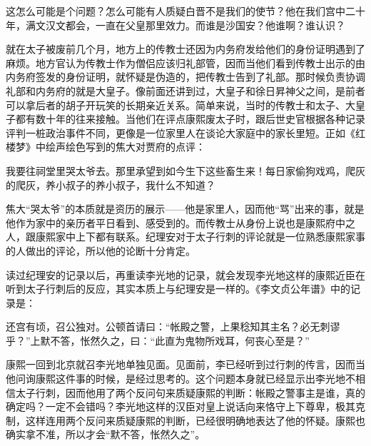 
\begin{bookquote}这怎么可能是个问题？怎么可能有人质疑白晋不是我们的使节？他在我们宫中二十年，满文汉文都会，一直在父皇那里效力。而谁是沙国安？他谁啊？谁认识？\end{bookquote}


就在太子被废前几个月，地方上的传教士还因为内务府发给他们的身份证明遇到了麻烦。地方官认为传教士作为僧侣应该归礼部管，因而当他们看到传教士出示的由内务府签发的身份证明，就怀疑是伪造的，把传教士告到了礼部。那时候负责协调礼部和内务府的就是大皇子。像前面还讲到过，大皇子和徐日昇神父之间，是前者可以拿后者的胡子开玩笑的长期亲近关系。简单来说，当时的传教士和太子、大皇子都有数十年的往来接触。当他们在评点康熙废太子时，跟后世史官根据各种记录评判一桩政治事件不同，更像是一位家里人在谈论大家庭中的家长里短。正如《红楼梦》中绘声绘色写到的焦大对贾府的点评：



\begin{bookquote}我要往祠堂里哭太爷去。那里承望到如今生下这些畜生来！每日家偷狗戏鸡，爬灰的爬灰，养小叔子的养小叔子，我什么不知道？\end{bookquote}


焦大“哭太爷”的本质就是资历的展示——他是家里人，因而他“骂”出来的事，就是他作为家中的亲历者平日看到、感受到的。而传教士从身份上说也是康熙府中之人，跟康熙家中上下都有联系。纪理安对于太子行刺的评论就是一位熟悉康熙家事的人做出的评论，所以他的论断十分肯定。



读过纪理安的记录以后，再重读李光地的记录，就会发现李光地这样的康熙近臣在听到太子行刺后的反应，其实本质上与纪理安是一样的。《李文贞公年谱》中的记录是：



\begin{bookquote}还宫有顷，召公独对。公顿首请曰：“帐殿之警，上果稔知其主名？必无刺谬乎？”上默不答，怅然久之，曰：“此直为鬼物所戏耳，何丧心至是？”\end{bookquote}


康熙一回到北京就召李光地单独见面。见面前，李已经听到过行刺的传言，因而当他问询康熙这件事的时候，是经过思考的。这个问题本身就已经显示出李光地不相信太子行刺，因而他用了两个反问句来质疑康熙的判断：帐殿之警事主是谁，真的确定吗？一定不会错吗？李光地这样的汉臣对皇上说话向来恪守上下尊卑，极其克制，这样连用两个反问来质疑康熙的判断，已经很明确地表达了他的怀疑。康熙也确实拿不准，所以才会“默不答，怅然久之”。


